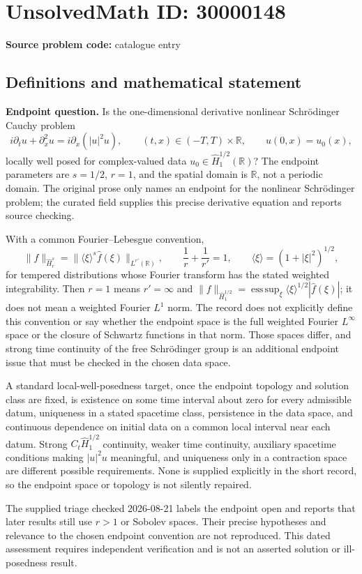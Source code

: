 \documentclass[11pt]{article}
\newcommand{\R}{\mathbb{R}}
\begin{document}
\section*{UnsolvedMath ID: 30000148}
\textbf{Source problem code:} catalogue entry
\subsection{Definitions and mathematical statement}
\textbf{Endpoint question.} Is the one-dimensional derivative nonlinear Schr\"odinger Cauchy problem\[i\partial_tu+\partial_x^2u=i\partial_x(|u|^2u),\qquad (t,x)\in(-T,T)\times\R,\qquad u(0,x)=u_0(x),\] locally well posed for complex-valued data \(u_0\in\widehat H^{1/2}_1(\R)\)? The endpoint parameters are \(s=1/2\), \(r=1\), and the spatial domain is \(\R\), not a periodic domain. The original prose only names an endpoint for the nonlinear Schr\"odinger problem; the curated field supplies this precise derivative equation and reports source checking.\par With a common Fourier--Lebesgue convention,\[\|f\|_{\widehat H^s_r}=\|\langle\xi\rangle^s\widehat f(\xi)\|_{L^{r'}(\R)},\qquad \frac1r+\frac1{r'}=1,\qquad \langle\xi\rangle=(1+|\xi|^2)^{1/2},\] for tempered distributions whose Fourier transform has the stated weighted integrability. Then \(r=1\) means \(r'=\infty\) and \(\|f\|_{\widehat H^{1/2}_1}=\operatorname*{ess\,sup}_{\xi}\langle\xi\rangle^{1/2}|\widehat f(\xi)|\); it does not mean a weighted Fourier \(L^1\) norm. The record does not explicitly define this convention or say whether the endpoint space is the full weighted Fourier \(L^\infty\) space or the closure of Schwartz functions in that norm. Those spaces differ, and strong time continuity of the free Schr\"odinger group is an additional endpoint issue that must be checked in the chosen data space.\par A standard local-well-posedness target, once the endpoint topology and solution class are fixed, is existence on some time interval about zero for every admissible datum, uniqueness in a stated spacetime class, persistence in the data space, and continuous dependence on initial data on a common local interval near each datum. Strong \(C_t\widehat H^{1/2}_1\) continuity, weaker time continuity, auxiliary spacetime conditions making \(|u|^2u\) meaningful, and uniqueness only in a contraction space are different possible requirements. None is supplied explicitly in the short record, so the endpoint space or topology is not silently repaired.\par The supplied triage checked 2026-08-21 labels the endpoint open and reports that later results still use \(r>1\) or Sobolev spaces. Their precise hypotheses and relevance to the chosen endpoint convention are not reproduced. This dated assessment requires independent verification and is not an asserted solution or ill-posedness result.
\end{document}
